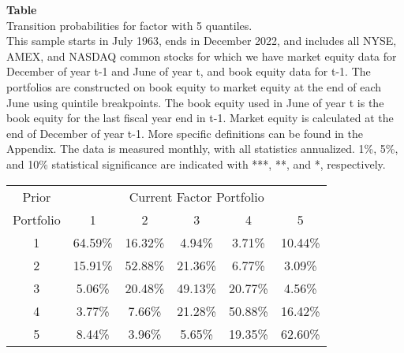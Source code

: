 \begin{table*}[ht!]
\raggedright
{}
\label{tab: transition_probs_OP_BEindustry_adjusted_with_5_quantiles}
\textbf{Table \thetable} \\
Transition probabilities for factor with 5 quantiles. \\
\hspace*{1em}This sample starts in July 1963, ends in December 2022, and includes all NYSE, AMEX, and NASDAQ common stocks for which we have market equity data for December of year t-1 and June of year t, and book equity data for t-1. The portfolios are constructed on book equity to market equity at the end of each June using quintile breakpoints.  The book equity used in June of year t is the book equity for the last fiscal year end in t-1.  Market equity is calculated at the end of December of year t-1.  More specific definitions can be found in the Appendix.  The data is measured monthly, with all statistics annualized.  1\%, 5\%, and 10\% statistical significance are indicated with ***, **, and *, respectively. \\
\vspace{0.5em}
\centering
\begin{adjustbox}{max width=\textwidth}
\begin{tabular}{@{}cccccc@{}}
\toprule
Prior & \multicolumn{5}{c}{Current Factor Portfolio} \\
Portfolio & 1 & 2 & 3 & 4 & 5 \\
\midrule
1 & 64.59\% & 16.32\% & 4.94\% & 3.71\% & 10.44\% \\
2 & 15.91\% & 52.88\% & 21.36\% & 6.77\% & 3.09\% \\
3 & 5.06\% & 20.48\% & 49.13\% & 20.77\% & 4.56\% \\
4 & 3.77\% & 7.66\% & 21.28\% & 50.88\% & 16.42\% \\
5 & 8.44\% & 3.96\% & 5.65\% & 19.35\% & 62.60\% \\
\bottomrule
\end{tabular}
\end{adjustbox}
\end{table*}